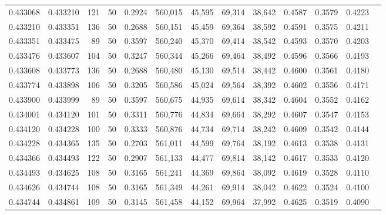 \begin{tabular}{rrrrrrrrrrrrr}
0.433068 & 0.433210 &   121 &  50 &                                     0.2924 & 560,015 &  45,595 &  69,314 &  38,642 & 0.4587 & 0.3579 & 0.4223 \\
0.433210 & 0.433351 &   136 &  50 &                                     0.2688 & 560,151 &  45,459 &  69,364 &  38,592 & 0.4591 & 0.3575 & 0.4211 \\
0.433351 & 0.433475 &    89 &  50 &                                     0.3597 & 560,240 &  45,370 &  69,414 &  38,542 & 0.4593 & 0.3570 & 0.4203 \\
0.433476 & 0.433607 &   104 &  50 &                                     0.3247 & 560,344 &  45,266 &  69,464 &  38,492 & 0.4596 & 0.3566 & 0.4193 \\
0.433608 & 0.433773 &   136 &  50 &                                     0.2688 & 560,480 &  45,130 &  69,514 &  38,442 & 0.4600 & 0.3561 & 0.4180 \\
0.433774 & 0.433898 &   106 &  50 &                                     0.3205 & 560,586 &  45,024 &  69,564 &  38,392 & 0.4602 & 0.3556 & 0.4171 \\
0.433900 & 0.433999 &    89 &  50 &                                     0.3597 & 560,675 &  44,935 &  69,614 &  38,342 & 0.4604 & 0.3552 & 0.4162 \\
0.434001 & 0.434120 &   101 &  50 &                                     0.3311 & 560,776 &  44,834 &  69,664 &  38,292 & 0.4607 & 0.3547 & 0.4153 \\
0.434120 & 0.434228 &   100 &  50 &                                     0.3333 & 560,876 &  44,734 &  69,714 &  38,242 & 0.4609 & 0.3542 & 0.4144 \\
0.434228 & 0.434365 &   135 &  50 &                                     0.2703 & 561,011 &  44,599 &  69,764 &  38,192 & 0.4613 & 0.3538 & 0.4131 \\
0.434366 & 0.434493 &   122 &  50 &                                     0.2907 & 561,133 &  44,477 &  69,814 &  38,142 & 0.4617 & 0.3533 & 0.4120 \\
0.434493 & 0.434625 &   108 &  50 &                                     0.3165 & 561,241 &  44,369 &  69,864 &  38,092 & 0.4619 & 0.3528 & 0.4110 \\
0.434626 & 0.434744 &   108 &  50 &                                     0.3165 & 561,349 &  44,261 &  69,914 &  38,042 & 0.4622 & 0.3524 & 0.4100 \\
0.434744 & 0.434861 &   109 &  50 &                                     0.3145 & 561,458 &  44,152 &  69,964 &  37,992 & 0.4625 & 0.3519 & 0.4090 \\

\end{tabular}
